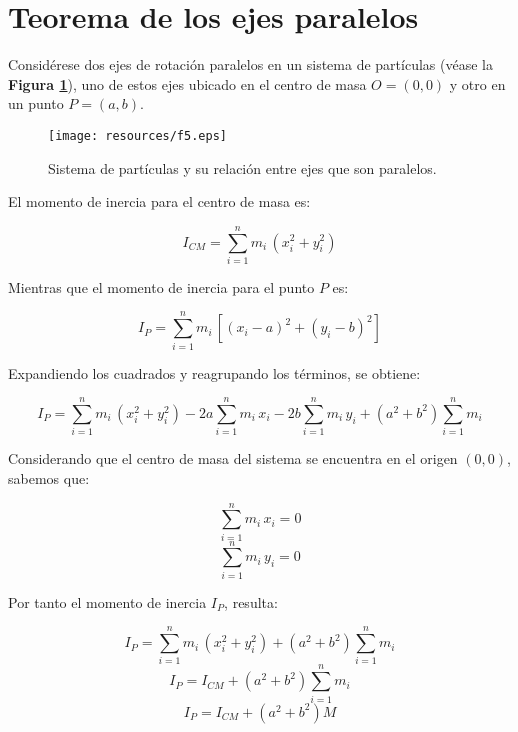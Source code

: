 \documentclass[letter,twoside,11pt]{article}
\begin{document}
\section{Teorema de los ejes paralelos \cite{Sears}}

Considérese dos ejes de rotación paralelos en un sistema de partículas (véase la
\textbf{Figura \ref{figura5}}), uno de estos ejes ubicado en el centro de masa
$O = (0,0)$ y otro en un punto $P = (a,b)$.

\begin{figure}
\centering
\texttt{[image: resources/f5.eps]}
\caption{Sistema de partículas y su relación entre ejes que son paralelos.}
\label{figura5}
\end{figure}

El momento de inercia para el centro de masa es:

\begin{equation*}
    I_{CM} = \sum_{i=1}^{n} m_i\, (x^2_i + y^2_i)
\end{equation*}

Mientras que el momento de inercia  para el punto $P$ es:

\begin{equation*}
    I_{P} = \sum_{i=1}^{n} m_i\, [ (x_i-a)^2 + (y_i-b)^2 ]
\end{equation*}

Expandiendo los cuadrados y reagrupando los términos, se obtiene:

\begin{equation*}
    I_{P} = \sum_{i=1}^{n} m_i\, (x^2_i + y^2_i) - 2a \sum_{i=1}^{n} m_i\, x_i - 2b \sum_{i=1}^{n} m_i\, y_i + (a^2 + b^2) \sum_{i=1}^{n} m_i
\end{equation*}

Considerando que el centro de masa del sistema se encuentra en el origen
$(0,0)$, sabemos que:

\begin{equation*}
    \sum_{i=1}^{n} m_i\, x_i = 0
\end{equation*}
\begin{equation*}
    \sum_{i=1}^{n} m_i\, y_i = 0
\end{equation*}

Por tanto el momento de inercia $I_P$, resulta:

\begin{equation*}
    I_{P} = \sum_{i=1}^{n} m_i\, (x^2_i + y^2_i) + (a^2 + b^2) \sum_{i=1}^{n} m_i
\end{equation*}
\begin{equation*}
    I_{P} = I_{CM} + (a^2 + b^2) \sum_{i=1}^{n} m_i
\end{equation*}
\begin{equation*}
    I_{P} = I_{CM} + (a^2 + b^2) M
\end{equation*}
\end{document}
